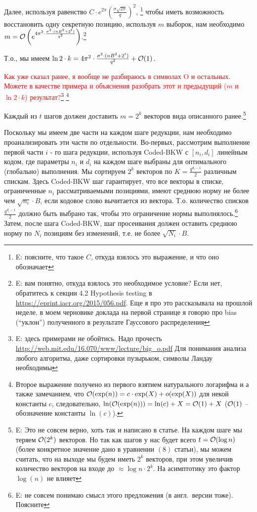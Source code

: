 \documentclass[a4paper,11pt]{article}
\begin{document}
Далее, используя равенство $C \cdot e^{2\pi}(\frac{\sigma \sqrt{2\pi}}{q})^2$, \footnote{E: поясните, что такое $C$, откуда взялось это выражение, и что оно обозначает} чтобы иметь возможность восстановить одну секретную позицию, используя $m$ выборок, нам необходимо $m=\mathcal{O}\left(e^{4\pi^2 \cdot \frac{\sigma^2 \cdot (nB^2+2^t)}{q^2}}\right)$.\footnote{E: вам понятно, откуда взялось это необходимое условие? Если нет, обратитесь к секции 4.2 Hypothesis testing в \url{https://eprint.iacr.org/2015/056.pdf}. Еще я про это рассказывала на прошлой неделе, в моем черновике доклада на первой странице я говорю про bias (``уклон'') полученного в результате Гауссового распределения }

Т.о., мы имеем $\ln{2} \cdot k = 4\pi^2 \cdot \frac{\sigma^2 \cdot (nB^2+2^t)}{q^2} + \mathcal{O}(1)$.

\textcolor{red}{Как уже сказал ранее, я вообще не разбираюсь в символах O и остальных. Можете в качестве примера и объяснения разобрать этот и предыдущий ($m$ и $\ln{2} \cdot k$) результат?}\footnote{E: здесь примерами не обойтись. Надо прочесть \url{http://web.mit.edu/16.070/www/lecture/big_o.pdf}
Для понимания анализа любого алгоритма, даже сортировки пузырьком, символы Ландау необходимы
}
\footnote{Второе выражение получено из первого взятием натурального логарифма и а также замечанием, что $\mathcal{O}(\exp(n)) = c \cdot \exp(X) + o(\exp(X))$ для некой константы $c$, следовательно, $ \ln(\mathcal{O}(\exp(n)) ) = \ln(c) + X = \mathcal{O}(1) + X$ ($\mathcal{O}(1)$ -- обозначение константы $\ln(c)$).  }

Каждый из $t$ шагов должен доставить $m=2^k$ векторов вида описанного ранее.\footnote{E: Это не совсем верно, хоть так и написано в статье. На каждом шаге мы теряем $\mathcal{O}(2^k)$ векторов. Но так как шагов у нас будет всего $t = \mathcal{O}(\log n)$ (более конкретное значение дано в уравнении $(8)$ статьи), мы можем считать, что на выходе мы будем иметь $2^k$ векторов, при этом увеличив количество векторов на входе до $\approx \log n \cdot 2^k$. На асимптотику это фактор $\log(n)$ не влияет}

Поскольку мы имеем две части на каждом шаге редукции, нам необходимо проанализировать эти части по отдельности. Во-первых, рассмотрим выполнение первой части $i$ - го шага редукции, используя Coded-BKW с $[n_i,d_i]$ линейным кодом, где параметры $n_i$ и $d_i$ на каждом шаге выбраны для оптимального (глобально) выполнения. Мы сортируем $2^k$ векторов по $K=\frac{q^{d_i - 1}}{2}$ различным спискам. Здесь Coded-BKW шаг гарантирует, что все векторы в списке, ограниченные $n_i$ рассматриваемыми позициями, имеют среднюю норму не более чем $\sqrt{n_i}\cdot B$, если кодовое слово вычитается из вектора. Т.о. количество списков $\frac{q^{d_i - 1}}{2}$ должно быть выбрано так, чтобы это ограничение нормы выполнялось.\footnote{E: не совсем понимаю смысл этого предложения (в англ.\ версии тоже). Поясните} Затем, после шага Coded-BKW, шаг просеивания должен оставить среднюю норму по $N_i$ позициям без изменений, т.е. не более $\sqrt{N_i}\cdot B$.
\end{document}
